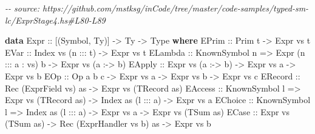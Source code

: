 \documentclass[]{article}
\newenvironment{Shaded}{}{}
\newcommand{\CommentTok}[1]{\textcolor[rgb]{0.38,0.63,0.69}{\textit{#1}}}
\newcommand{\DataTypeTok}[1]{\textcolor[rgb]{0.56,0.13,0.00}{#1}}
\newcommand{\KeywordTok}[1]{\textcolor[rgb]{0.00,0.44,0.13}{\textbf{#1}}}
\newcommand{\NormalTok}[1]{#1}
\newcommand{\OperatorTok}[1]{\textcolor[rgb]{0.40,0.40,0.40}{#1}}
\newcommand{\OtherTok}[1]{\textcolor[rgb]{0.00,0.44,0.13}{#1}}
\begin{document}
\begin{Shaded}
\begin{Highlighting}[]
\CommentTok{{-}{-} source: https://github.com/mstksg/inCode/tree/master/code{-}samples/typed{-}sm{-}lc/ExprStage4.hs\#L80{-}L89}

\KeywordTok{data} \DataTypeTok{Expr}\OtherTok{ ::}\NormalTok{ [(}\DataTypeTok{Symbol}\NormalTok{, }\DataTypeTok{Ty}\NormalTok{)] }\OtherTok{{-}\textgreater{}} \DataTypeTok{Ty} \OtherTok{{-}\textgreater{}} \DataTypeTok{Type} \KeywordTok{where}
  \DataTypeTok{EPrim}\OtherTok{ ::} \DataTypeTok{Prim}\NormalTok{ t }\OtherTok{{-}\textgreater{}} \DataTypeTok{Expr}\NormalTok{ vs t}
  \DataTypeTok{EVar}\OtherTok{ ::} \DataTypeTok{Index}\NormalTok{ vs (n }\OperatorTok{:::}\NormalTok{ t) }\OtherTok{{-}\textgreater{}} \DataTypeTok{Expr}\NormalTok{ vs t}
  \DataTypeTok{ELambda}\OtherTok{ ::} \DataTypeTok{KnownSymbol}\NormalTok{ n }\OtherTok{=\textgreater{}} \DataTypeTok{Expr}\NormalTok{ (n }\OperatorTok{:::}\NormalTok{ a \textquotesingle{}}\OperatorTok{:}\NormalTok{ vs) b }\OtherTok{{-}\textgreater{}} \DataTypeTok{Expr}\NormalTok{ vs (a }\OperatorTok{:{-}\textgreater{}}\NormalTok{ b)}
  \DataTypeTok{EApply}\OtherTok{ ::} \DataTypeTok{Expr}\NormalTok{ vs (a }\OperatorTok{:{-}\textgreater{}}\NormalTok{ b) }\OtherTok{{-}\textgreater{}} \DataTypeTok{Expr}\NormalTok{ vs a }\OtherTok{{-}\textgreater{}} \DataTypeTok{Expr}\NormalTok{ vs b}
  \DataTypeTok{EOp}\OtherTok{ ::} \DataTypeTok{Op}\NormalTok{ a b c }\OtherTok{{-}\textgreater{}} \DataTypeTok{Expr}\NormalTok{ vs a }\OtherTok{{-}\textgreater{}} \DataTypeTok{Expr}\NormalTok{ vs b }\OtherTok{{-}\textgreater{}} \DataTypeTok{Expr}\NormalTok{ vs c}
  \DataTypeTok{ERecord}\OtherTok{ ::} \DataTypeTok{Rec}\NormalTok{ (}\DataTypeTok{ExprField}\NormalTok{ vs) as }\OtherTok{{-}\textgreater{}} \DataTypeTok{Expr}\NormalTok{ vs (}\DataTypeTok{TRecord}\NormalTok{ as)}
  \DataTypeTok{EAccess}\OtherTok{ ::} \DataTypeTok{KnownSymbol}\NormalTok{ l }\OtherTok{=\textgreater{}} \DataTypeTok{Expr}\NormalTok{ vs (}\DataTypeTok{TRecord}\NormalTok{ as) }\OtherTok{{-}\textgreater{}} \DataTypeTok{Index}\NormalTok{ as (l }\OperatorTok{:::}\NormalTok{ a) }\OtherTok{{-}\textgreater{}} \DataTypeTok{Expr}\NormalTok{ vs a}
  \DataTypeTok{EChoice}\OtherTok{ ::} \DataTypeTok{KnownSymbol}\NormalTok{ l }\OtherTok{=\textgreater{}} \DataTypeTok{Index}\NormalTok{ as (l }\OperatorTok{:::}\NormalTok{ a) }\OtherTok{{-}\textgreater{}} \DataTypeTok{Expr}\NormalTok{ vs a }\OtherTok{{-}\textgreater{}} \DataTypeTok{Expr}\NormalTok{ vs (}\DataTypeTok{TSum}\NormalTok{ as)}
  \DataTypeTok{ECase}\OtherTok{ ::} \DataTypeTok{Expr}\NormalTok{ vs (}\DataTypeTok{TSum}\NormalTok{ as) }\OtherTok{{-}\textgreater{}} \DataTypeTok{Rec}\NormalTok{ (}\DataTypeTok{ExprHandler}\NormalTok{ vs b) as }\OtherTok{{-}\textgreater{}} \DataTypeTok{Expr}\NormalTok{ vs b}
\end{Highlighting}
\end{Shaded}
\end{document}
